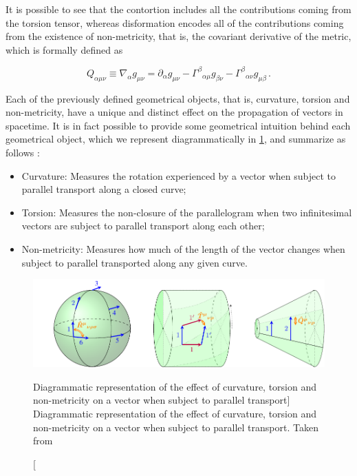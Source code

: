 It is possible to see that the contortion includes all the contributions coming from the torsion tensor, whereas disformation encodes all of the contributions coming from the existence of non-metricity, that is, the covariant derivative of the metric, which is formally defined as

\begin{equation}
    Q_{\alpha \mu \nu} \equiv \nabla_\alpha g_{\mu \nu} =
    \partial_\alpha g_{\mu \nu} - \Gamma^\beta{}_{\alpha \mu} g_{\beta \nu} - \Gamma^\beta{}_{\alpha \nu} g_{\mu \beta} \,.
\end{equation}

Each of the previously defined geometrical objects, that is, curvature, torsion and non-metricity, have a unique and distinct effect on the propagation of vectors in spacetime. It is in fact possible to provide some geometrical intuition behind each geometrical object, which we represent diagrammatically in \cref{fig:geometrical-interpretation}, and summarize as follows \cite{Jimenez2019a}:

\begin{itemize}
    \item Curvature: Measures the rotation experienced by a vector when subject to parallel transport along a closed curve;
    \item Torsion: Measures the non-closure of the parallelogram when two infinitesimal vectors are subject to parallel transport along each other;
    \item Non-metricity: Measures how much of the length of the vector changes when subject to parallel transported along any given curve.
\end{itemize}

\begin{figure}[h!]
    \centering
    \includegraphics{figures/geometrical-interpretation.pdf}
    \caption
    [Diagrammatic representation of the effect of curvature, torsion and non-metricity on a vector when subject to parallel transport]
    {Diagrammatic representation of the effect of curvature, torsion and non-metricity on a vector when subject to parallel transport. Taken from \cite{Teleparallel-R2021}}
    \label{fig:geometrical-interpretation}
\end{figure}


